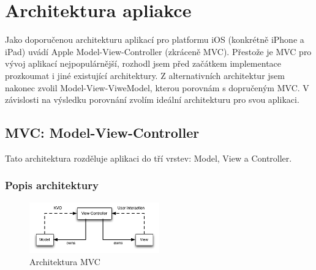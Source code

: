 \section{Architektura apliakce}\label{analyza-architektura}

Jako doporučenou architekturu aplikací pro platformu iOS (konkrétně iPhone a iPad) uvádí Apple Model-View-Controller (zkráceně MVC).
Přestože je MVC pro vývoj aplikací nejpopulárnější, rozhodl jsem před začátkem implementace prozkoumat i jiné existující architektury.
Z alternativních architektur jsem nakonec zvolil Model-View-ViweModel, kterou porovnám s dopručeným MVC.
V závislosti na výsledku porovnání zvolím ideální architekturu pro svou aplikaci.

\subsection{MVC: Model-View-Controller}\label{analyza-mvc}
Tato architektura rozděluje aplikaci do tří vrstev: Model, View a Controller.

\subsubsection{Popis architektury}

\begin{figure}\centering
	\includegraphics[width=0.5\textwidth]{assets/mvc-architecture.png}
	\caption[Architektura MVC]{Architektura MVC}\label{fig:architektura-mvc}
\end{figure}

